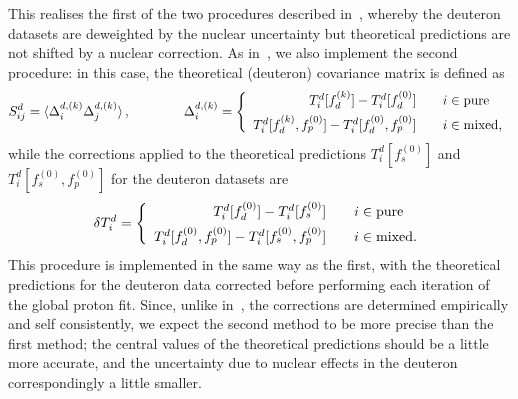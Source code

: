 \documentclass[11pt,a4paper]{article}
\begin{document}
This realises the first of the two procedures described in~\cite{Ball:2018twp},
whereby the deuteron datasets are deweighted by the nuclear uncertainty but
theoretical predictions are not shifted by a nuclear correction.
As in~\cite{Ball:2018twp}, we also implement the second procedure:
in this case, the theoretical (deuteron) covariance matrix is defined as
\begin{equation}
  S_{ij}^d
  =\langle\Delta_i^{d,(k)}\Delta_j^{d,(k)}\rangle\,,
  \qquad\qquad
  \Delta_i^{d,(k)}= \left\{\begin{array}{r@{\qquad}l}
    T_i^d[f_d^{(k)}]-T_i^d[f_d^{(0)}]  & i\in {\rm pure} \\[1ex]
    T_i^d[f_d^{(k)},f_p^{(0)}]-T_i^d[f_d^{(0)},f_p^{(0)}]  &  i\in {\rm mixed,}
   \end{array}\right.
  \label{eq:deuteroncovmatrixnew}
\end{equation}
while the corrections applied to the theoretical predictions $T_i^d[f_s^{(0)}]$
and $T_i^d[f_s^{(0)},f_p^{(0)}]$ for the deuteron datasets are
\begin{equation}
  \delta T_i^d=\left\{\begin{array}{r@{\qquad}l}
    T_i^d[f_d^{(0)}]-T_i^d[f_s^{(0)}]  & i\in {\rm pure} \\[1ex]
    T_i^d[f_d^{(0)},f_p^{(0)}]-T_i^d[f_s^{(0)},f_p^{(0)}]  &  i\in {\rm mixed.}
   \end{array}\right. 
  \label{eq:deuteroncovmatrixshift}
\end{equation}
This procedure is implemented in the same way as the first, with the
theoretical predictions for the deuteron data corrected before performing each
iteration of the global proton fit. Since, unlike in~\cite{Ball:2018twp},
the corrections are determined empirically and self consistently, we expect the
second method to be more precise than the first method; the central
values of the theoretical predictions should be a little more accurate, and the
uncertainty due to nuclear effects in the deuteron correspondingly a little
smaller.


\end{document}
